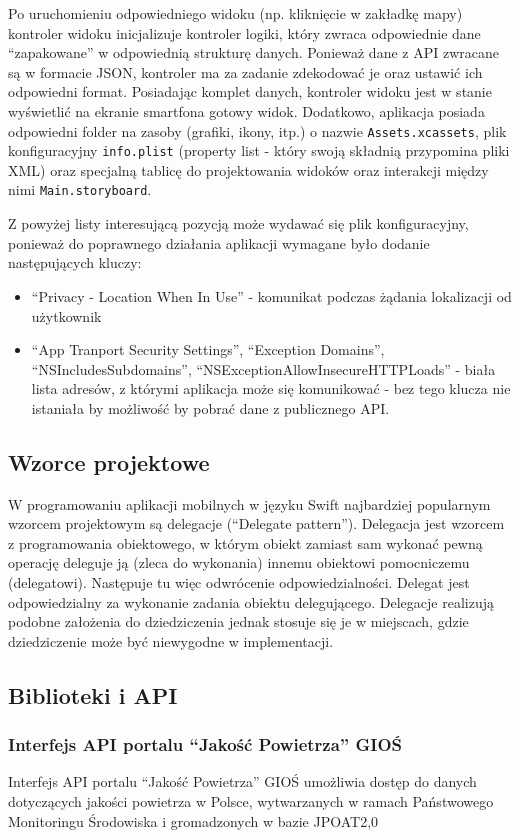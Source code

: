 \documentclass[a4paper,11pt,titlepage]{article}
\begin{document}
Po uruchomieniu odpowiedniego widoku (np. kliknięcie w zakładkę mapy) kontroler widoku inicjalizuje kontroler logiki, który zwraca odpowiednie dane ``zapakowane'' w odpowiednią strukturę danych. Ponieważ dane z API zwracane są w formacie JSON, kontroler ma za zadanie zdekodować je oraz ustawić ich odpowiedni format. Posiadając komplet danych, kontroler widoku jest w stanie wyświetlić na ekranie smartfona gotowy widok.
Dodatkowo, aplikacja posiada odpowiedni folder na zasoby (grafiki, ikony, itp.) o nazwie \verb|Assets.xcassets|, plik konfiguracyjny \verb|info.plist| (property list - który swoją składnią przypomina pliki XML) oraz specjalną tablicę do projektowania widoków oraz interakcji między nimi  \verb|Main.storyboard|.

Z powyżej listy interesującą pozycją może wydawać się plik konfiguracyjny, ponieważ do poprawnego działania aplikacji wymagane było dodanie następujących kluczy:
\begin{itemize}
 	\item ``Privacy - Location When In Use'' - komunikat podczas żądania lokalizacji od użytkownik
	\item ``App Tranport Security Settings'', ``Exception Domains'', ``NSIncludesSubdomains'', ``NSExceptionAllowInsecureHTTPLoads'' - biała lista adresów, z którymi aplikacja może się komunikować - bez tego klucza nie istaniała by możliwość by pobrać dane z publicznego API.
\end{itemize}

\subsection{Wzorce projektowe}
W programowaniu aplikacji mobilnych w języku Swift najbardziej popularnym wzorcem projektowym są delegacje (``Delegate pattern''). Delegacja jest wzorcem z programowania obiektowego, w którym obiekt zamiast sam wykonać pewną operację deleguje ją (zleca do wykonania) innemu obiektowi pomocniczemu (delegatowi). Następuje tu więc odwrócenie odpowiedzialności. Delegat jest odpowiedzialny za wykonanie zadania obiektu delegującego. Delegacje realizują podobne założenia do dziedziczenia jednak stosuje się je w miejscach, gdzie dziedziczenie może być niewygodne w implementacji.


\subsection{Biblioteki i API}
\subsubsection{Interfejs API portalu ``Jakość Powietrza'' GIOŚ}
Interfejs API portalu ``Jakość Powietrza''  GIOŚ umożliwia dostęp do danych dotyczących jakości powietrza w Polsce, wytwarzanych w ramach Państwowego Monitoringu Środowiska i gromadzonych w bazie JPOAT2,0
\end{document}
